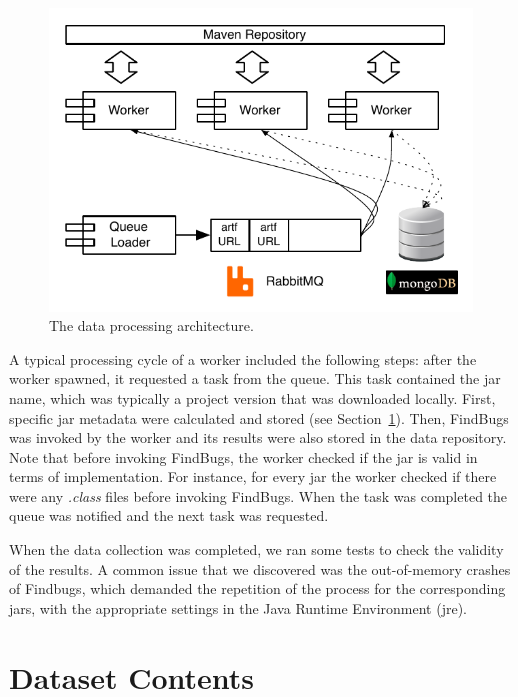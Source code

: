 \documentclass{sig-alternate}
\begin{document}
\begin{figure}[t]
  \begin{center}
    \includegraphics[scale=0.66]{figures/arch.pdf}
  \end{center}
  \caption{The data processing architecture.}
  \label{fig:arch}
\end{figure}

A typical processing cycle of a worker included the
following steps: after the worker spawned, it requested a task
from the queue. This task contained the {\sc jar} name, which
was typically a project version that was downloaded locally.
First, specific {\sc jar} metadata were calculated and stored
(see Section~\ref{sec:data}).
Then, FindBugs was invoked
by the worker and its results were also stored in the data
repository.
Note that before invoking FindBugs,
the worker checked if the {\sc jar} is valid in terms of implementation.
For instance, for every {\sc jar} the worker checked
if there were any {\it .class} files before invoking FindBugs.
When the task was completed
the queue was notified and the next task was requested.

When the data collection was completed, we ran some tests
to check the validity of the results.
A common issue that we discovered was the out-of-memory
crashes of Findbugs, which demanded the repetition of the process
for the corresponding {\sc jar}s, with the appropriate
settings in the Java Runtime Environment ({\sc jre}).

\section{Dataset Contents}
\label{sec:data}
\end{document}
